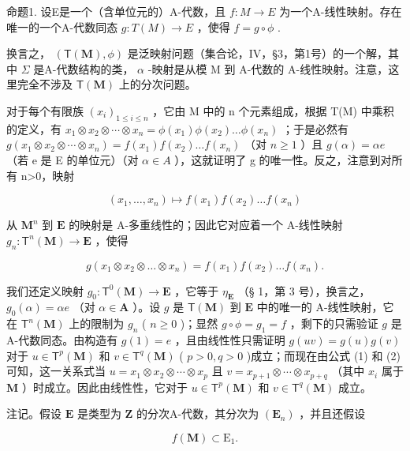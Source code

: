 命题1. 设E是一个（含单位元的）A-代数，且 \(f:M\to E\) 为一个A-线性映射。存在唯一的一个A-代数同态 \(g:T(M)\to E\) ，使得 \(f=g\circ\phi\) .

换言之， \((\mathsf{T}(\mathbf{M}), \phi)\) 是泛映射问题（集合论，IV，§3，第1号）的一个解，其中 \(\Sigma\) 是A-代数结构的类， \(\alpha\) -映射是从模 M 到 A-代数的 A-线性映射。注意，这里完全不涉及 \(\mathsf{T}(\mathbf{M})\) 上的分次问题。

对于每个有限族 \((x_{i})_{1\leqslant i\leqslant n}\) ，它由 M 中的 n 个元素组成，根据 T(M) 中乘积的定义，有 \(x_{1}\otimes x_{2}\otimes\cdots\otimes x_{n}=\phi(x_{1})\phi(x_{2})\ldots\phi(x_{n})\) ；于是必然有 \(g(x_{1}\otimes x_{2}\otimes\cdots\otimes x_{n})=f(x_{1})f(x_{2})\ldots f(x_{n})\) （对 \(n\geqslant1\) ）且 \(g(\alpha)=\alpha e\) （若 e 是 E 的单位元）（对 \(\alpha\in A\) ），这就证明了 g 的唯一性。反之，注意到对所有 n\textgreater0，映射

\[
(x _ {1}, \dots , x _ {n}) \mapsto f (x _ {1}) f (x _ {2}) \dots f (x _ {n})
\]

从 \(\mathbf{M}^n\) 到 \(\mathbf{E}\) 的映射是 A-多重线性的；因此它对应着一个 A-线性映射 \(g_n: \mathsf{T}^n(\mathbf{M}) \to \mathbf{E}\) ，使得

\[
g \left(x _ {1} \otimes x _ {2} \otimes \dots \otimes x _ {n}\right) = f \left(x _ {1}\right) f \left(x _ {2}\right) \dots f \left(x _ {n}\right).\tag{2}
\]

我们还定义映射 \(g_0 \colon \mathsf{T}^0(\mathbf{M}) \to \mathbf{E}\) ，它等于 \(\eta_{\mathbf{E}}\) （§ 1，第 3 号），换言之， \(g_0(\alpha) = \alpha e\) （对 \(\alpha \in \mathbf{A}\) ）。设 \(g\) 是 \(\mathsf{T}(\mathbf{M})\) 到 \(\mathbf{E}\) 中的唯一的 A-线性映射，它在 \(\mathsf{T}^n(\mathbf{M})\) 上的限制为 \(g_n\) ( \(n \geqslant 0\) )；显然 \(g \circ \phi = g_1 = f\) ，剩下的只需验证 \(g\) 是 A-代数同态。由构造有 \(g(1) = e\) ，且由线性性只需证明 \(g(uv) = g(u)g(v)\) 对于 \(u \in \mathsf{T}^p(\mathbf{M})\) 和 \(v \in \mathsf{T}^q(\mathbf{M})\) ( \(p > 0, q > 0\) )成立；而现在由公式 (1) 和 (2) 可知，这一关系式当 \(u = x_1 \otimes x_2 \otimes \cdots \otimes x_p\) 且 \(v = x_{p+1} \otimes \cdots \otimes x_{p+q}\) （其中 \(x_i\) 属于 \(\mathbf{M}\) ）时成立。因此由线性性，它对于 \(u \in \mathsf{T}^p(\mathbf{M})\) 和 \(v \in \mathsf{T}^q(\mathbf{M})\) 成立。

注记。假设 \(\mathbf{E}\) 是类型为 \(\mathbf{Z}\) 的分次A-代数，其分次为 \((\mathbf{E}_n)\) ，并且还假设

\[
f (\mathbf {M}) \subset \mathrm{E} _ {1}.\tag{3}
\]

